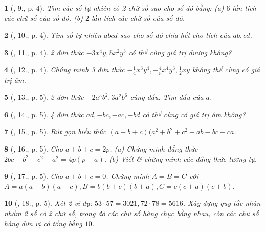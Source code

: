 \documentclass{article}
\newtheorem{baitoan}{}
\begin{document}
\begin{baitoan}[\cite{Binh_Toan_8_tap_1}, 9., p. 4]
	Tìm các số tự nhiên có 2 chữ số sao cho số đó bằng: (a) $6$ lần tích các chữ số của số đó. (b) $2$ lần tích các chữ số của số đó.
\end{baitoan}

\begin{baitoan}[\cite{Binh_Toan_8_tap_1}, 10., p. 4]
	Tìm số tự nhiên $\overline{abcd}$ sao cho số đó chia hết cho tích của $\overline{ab},\overline{cd}$.
\end{baitoan}

\begin{baitoan}[\cite{Binh_Toan_8_tap_1}, 11., p. 4]
	2 đơn thức $-3x^4y,5x^2y^3$ có thể cùng giá trị dương không?
\end{baitoan}

\begin{baitoan}[\cite{Binh_Toan_8_tap_1}, 12., p. 4]
	Chứng minh 3 đơn thức $-\frac{1}{4}x^3y^4,-\frac{4}{5}x^4y^3,\frac{1}{2}xy$ không thể cùng có giá trị âm.
\end{baitoan}

\begin{baitoan}[\cite{Binh_Toan_8_tap_1}, 13., p. 5]
	2 đơn thức $-2a^5b^2,3a^2b^6$ cùng dấu. Tìm dấu của $a$.
\end{baitoan}

\begin{baitoan}[\cite{Binh_Toan_8_tap_1}, 14., p. 5]
	4 đơn thức $ad,-bc,-ac,-bd$ có thể cùng có giá trị âm không?
\end{baitoan}

\begin{baitoan}[\cite{Binh_Toan_8_tap_1}, 15., p. 5]
	Rút gọn biểu thức $(a + b + c)(a^2 + b^2 + c^2 - ab - bc - ca$.
\end{baitoan}

\begin{baitoan}[\cite{Binh_Toan_8_tap_1}, 16., p. 5]
	Cho $a + b + c = 2p$. (a) Chứng minh đẳng thức $2bc + b^2 + c^2 - a^2 = 4p(p - a)$. (b) Viết \& chứng minh các đẳng thức tương tự.
\end{baitoan}

\begin{baitoan}[\cite{Binh_Toan_8_tap_1}, 17., p. 5]
	Cho $a + b + c = 0$. Chứng minh $A = B = C$ với $A = a(a + b)(a + c),B = b(b + c)(b + a),C = c(c + a)(c + b)$.
\end{baitoan}

\begin{baitoan}[\cite{Binh_Toan_8_tap_1}, 18., p. 5]
	Xét 2 ví dụ: $53\cdot57 = 3021,72\cdot78 = 5616$. Xây dựng quy tắc nhân nhẩm 2 số có 2 chữ số, trong đó các chữ số hàng chục bằng nhau, còn các chữ số hàng dơn vị có tổng bằng $10$.
\end{baitoan}
\end{document}
